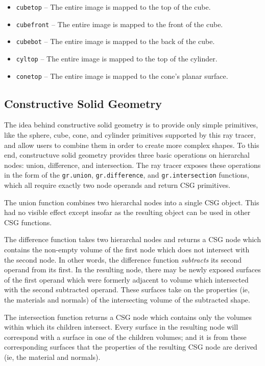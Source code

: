 \documentclass{article}
\begin{document}
\newcommand{\cmditem}[1]{\item {\tt #1}}

\begin{itemize}
  \cmditem{cubetop} -- The entire image is mapped to the top of the cube.
  \cmditem{cubefront} -- The entire image is mapped to the front of the cube.
  \cmditem{cubebot} -- The entire image is mapped to the back of the cube.
  \cmditem{cyltop} -- The entire image is mapped to the top of the cylinder.
  \cmditem{conetop} -- The entire image is mapped to the cone's planar surface.
\end{itemize}

\subsection{Constructive Solid Geometry}
\label{csg}

The idea behind constructive solid geometry is to provide only simple
primitives, like the sphere, cube, cone, and cylinder primitives supported by
this ray tracer, and allow users to combine them in order to create more complex
shapes. To this end, constructuve solid geometry provides three basic operations
on hierarchal nodes: union, difference, and intersection. The ray tracer exposes
these operations in the form of the {\tt gr.union}, {\tt gr.difference}, and
{\tt gr.intersection} functions, which all require exactly two node operands and
return CSG primitives.

The union function combines two hierarchal nodes into a single CSG object. This
had no visible effect except insofar as the resulting object can be used in
other CSG functions.

The difference function takes two hierarchal nodes and returns a CSG node which
contains the non-empty volume of the first node which does not intersect with
the second node. In other words, the difference function \emph{subtracts} its
second operand from its first. In the resulting node, there may be newly exposed
surfaces of the first operand which were formerly adjacent to volume which
intersected with the second subtracted operand. These surfaces take on the
properties (ie, the materials and normals) of the intersecting volume of the
subtracted shape.

The intersection function returns a CSG node which contains only the volumes
within which its children intersect. Every surface in the resulting node will
correspond with a surface in one of the children volumes; and it is from these
corresponding surfaces that the properties of the resulting CSG node are derived
(ie, the material and normals).
\end{document}
